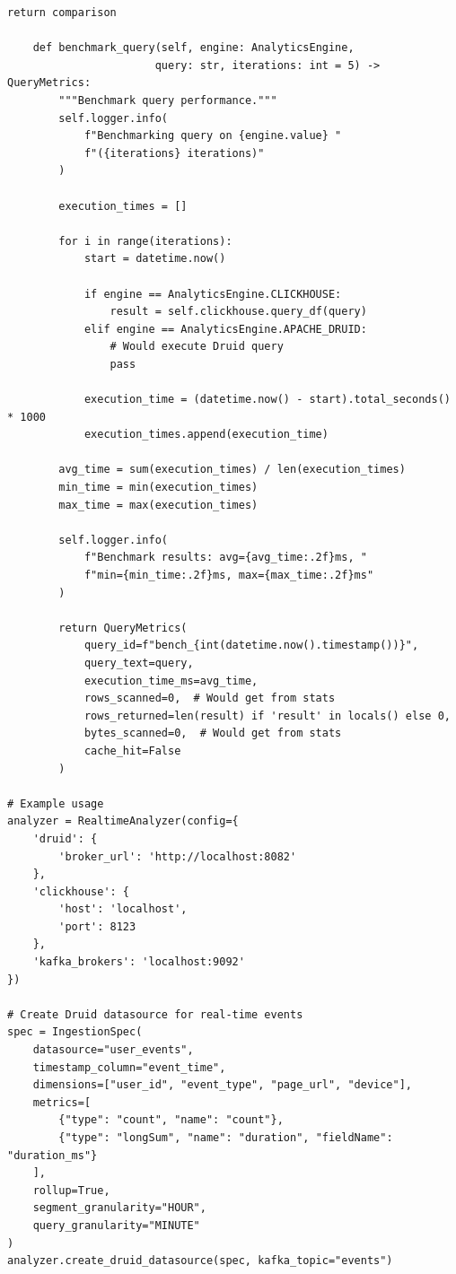 \begin{lstlisting}[style=python, caption=RealtimeAnalyzer with Sub-Second Query Performance]
        return comparison

    def benchmark_query(self, engine: AnalyticsEngine,
                       query: str, iterations: int = 5) -> QueryMetrics:
        """Benchmark query performance."""
        self.logger.info(
            f"Benchmarking query on {engine.value} "
            f"({iterations} iterations)"
        )

        execution_times = []

        for i in range(iterations):
            start = datetime.now()

            if engine == AnalyticsEngine.CLICKHOUSE:
                result = self.clickhouse.query_df(query)
            elif engine == AnalyticsEngine.APACHE_DRUID:
                # Would execute Druid query
                pass

            execution_time = (datetime.now() - start).total_seconds() * 1000
            execution_times.append(execution_time)

        avg_time = sum(execution_times) / len(execution_times)
        min_time = min(execution_times)
        max_time = max(execution_times)

        self.logger.info(
            f"Benchmark results: avg={avg_time:.2f}ms, "
            f"min={min_time:.2f}ms, max={max_time:.2f}ms"
        )

        return QueryMetrics(
            query_id=f"bench_{int(datetime.now().timestamp())}",
            query_text=query,
            execution_time_ms=avg_time,
            rows_scanned=0,  # Would get from stats
            rows_returned=len(result) if 'result' in locals() else 0,
            bytes_scanned=0,  # Would get from stats
            cache_hit=False
        )

# Example usage
analyzer = RealtimeAnalyzer(config={
    'druid': {
        'broker_url': 'http://localhost:8082'
    },
    'clickhouse': {
        'host': 'localhost',
        'port': 8123
    },
    'kafka_brokers': 'localhost:9092'
})

# Create Druid datasource for real-time events
spec = IngestionSpec(
    datasource="user_events",
    timestamp_column="event_time",
    dimensions=["user_id", "event_type", "page_url", "device"],
    metrics=[
        {"type": "count", "name": "count"},
        {"type": "longSum", "name": "duration", "fieldName": "duration_ms"}
    ],
    rollup=True,
    segment_granularity="HOUR",
    query_granularity="MINUTE"
)
analyzer.create_druid_datasource(spec, kafka_topic="events")


\end{lstlisting}
